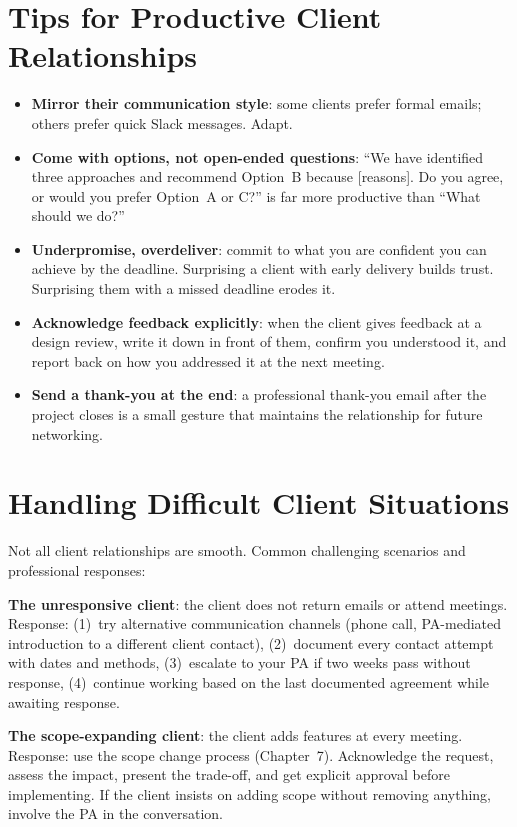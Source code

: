 \section{Tips for Productive Client Relationships}
\begin{itemize}[nosep,leftmargin=1.5em]
\item \textbf{Mirror their communication style}: some clients prefer formal emails; others prefer quick Slack messages. Adapt.
\item \textbf{Come with options, not open-ended questions}: ``We have identified three approaches and recommend Option~B because [reasons]. Do you agree, or would you prefer Option~A or C?'' is far more productive than ``What should we do?''
\item \textbf{Underpromise, overdeliver}: commit to what you are confident you can achieve by the deadline. Surprising a client with early delivery builds trust. Surprising them with a missed deadline erodes it.
\item \textbf{Acknowledge feedback explicitly}: when the client gives feedback at a design review, write it down in front of them, confirm you understood it, and report back on how you addressed it at the next meeting.
\item \textbf{Send a thank-you at the end}: a professional thank-you email after the project closes is a small gesture that maintains the relationship for future networking.
\end{itemize}


\section{Handling Difficult Client Situations}
Not all client relationships are smooth. Common challenging scenarios and professional responses:

\textbf{The unresponsive client}: the client does not return emails or attend meetings. Response: (1)~try alternative communication channels (phone call, PA-mediated introduction to a different client contact), (2)~document every contact attempt with dates and methods, (3)~escalate to your PA if two weeks pass without response, (4)~continue working based on the last documented agreement while awaiting response.

\textbf{The scope-expanding client}: the client adds features at every meeting. Response: use the scope change process (Chapter~7). Acknowledge the request, assess the impact, present the trade-off, and get explicit approval before implementing. If the client insists on adding scope without removing anything, involve the PA in the conversation.

